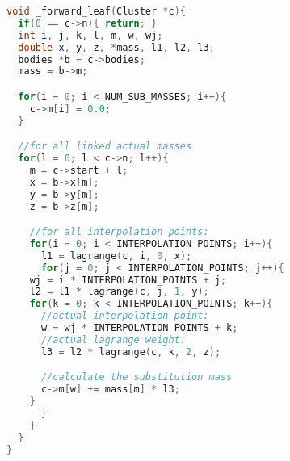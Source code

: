 \begin{figure}[p]
  \begin{subfigure}{0.9\textwidth}
    \begin{lstlisting}[language=C, label=lst:forwleaf, caption={Diese Methode erstellt die Clusterbasis des Clusterbaumes.}]
void _forward_leaf(Cluster *c){
  if(0 == c->n){ return; }
  int i, j, k, l, m, w, wj;
  double x, y, z, *mass, l1, l2, l3;
  bodies *b = c->bodies;
  mass = b->m;

  for(i = 0; i < NUM_SUB_MASSES; i++){
    c->m[i] = 0.0;
  }

  //for all linked actual masses
  for(l = 0; l < c->n; l++){
    m = c->start + l;
    x = b->x[m];
    y = b->y[m];
    z = b->z[m];

    //for all interpolation points:
    for(i = 0; i < INTERPOLATION_POINTS; i++){
      l1 = lagrange(c, i, 0, x);
      for(j = 0; j < INTERPOLATION_POINTS; j++){
	wj = i * INTERPOLATION_POINTS + j;
	l2 = l1 * lagrange(c, j, 1, y);
	for(k = 0; k < INTERPOLATION_POINTS; k++){
	  //actual interpolation point:
	  w = wj * INTERPOLATION_POINTS + k;
	  //actual lagrange weight:
	  l3 = l2 * lagrange(c, k, 2, z);

	  //calculate the substitution mass
	  c->m[w] += mass[m] * l3;
	}
      }
    }
  }
}   
    \end{lstlisting}
  \end{subfigure}
\end{figure}